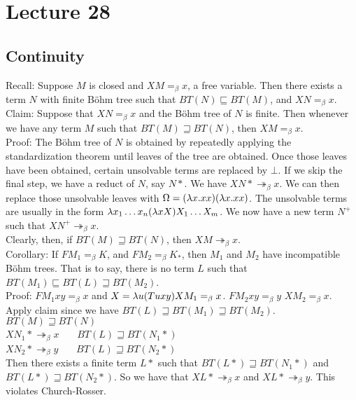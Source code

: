 \chapter{Lecture 28}
\section{Continuity}
Recall: Suppose $M$ is closed and $XM =_\beta x$, a free variable. Then there exists a term $N$ with finite B\"ohm tree such that $BT(N) \sqsubseteq BT(M)$, and $XN =_\beta x$.\\

Claim: Suppose that $XN =_\beta x$ and the B\"ohm tree of $N$ is finite. Then whenever we have any term $M$ such that $BT(M) \sqsupseteq BT(N)$, then $XM =_\beta x$.\\

Proof: The B\"ohm tree of $N$ is obtained by repeatedly applying the standardization theorem until leaves of the tree are obtained. Once those leaves have been obtained, certain unsolvable terms are replaced by $\bot$. If we skip the final step, we have a reduct of $N$, say $N*$. We have $XN* \twoheadrightarrow_\beta x$. We can then replace those unsolvable leaves with $\Omega = (\lambda x.xx)(\lambda x.xx)$. The unsolvable terms are usually in the form $\lambda x_1\ldots x_n (\lambda xX)X_1\ldots X_m$. We now have a new term $N^+$ such that $XN^+ \twoheadrightarrow_\beta x$.\\

Clearly, then, if $BT(M) \sqsupseteq BT(N)$, then $XM \twoheadrightarrow_\beta x$.\\

Corollary: If $FM_1 =_\beta K$, and $FM_2 =_\beta K_*$, then $M_1$ and $M_2$ have incompatible B\"ohm trees. That is to say, there is no term $L$ such that $BT(M_1) \sqsubseteq BT(L) \sqsupseteq BT(M_2)$.\\

Proof: $FM_1 xy =_\beta x$ and $X = \lambda u(T uxy)XM_1 =_\beta x$. $FM_2xy =_\beta y$ $XM_2 =_\beta x$. Apply claim since we have $BT(L) \sqsupseteq BT(M_1) \sqsupseteq BT(M_2)$. $BT(M) \sqsupseteq BT(N)$\\

$XN_1* \twoheadrightarrow_\beta x$ \ \ \  $ BT(L) \sqsupseteq BT(N_1*)$\\
$XN_2* \twoheadrightarrow_\beta y$ \ \ \ $BT(L) \sqsupseteq BT(N_2*)$\\
Then there exists a finite term $L*$ such that $BT(L*) \sqsupseteq BT(N_1*)$ and $BT(L*) \sqsupseteq BT(N_2*)$. So we have that $XL* \twoheadrightarrow_\beta x$ and $XL* \twoheadrightarrow_\beta y$. This violates Church-Rosser.\\

